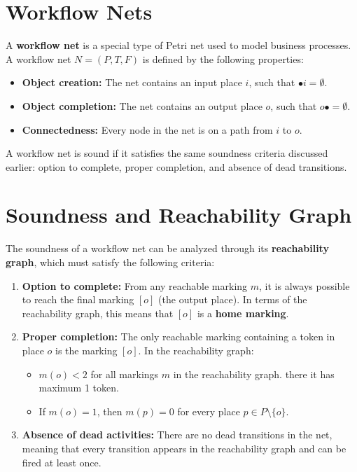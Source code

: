     \section{Workflow Nets}
    A \textbf{workflow net} is a special type of Petri net used to model business processes. A workflow net $N = (P, T, F)$ is defined by the following properties:
    \begin{itemize}
        \item \textbf{Object creation:} The net contains an input place $i$, such that $\bullet i = \emptyset$.
        \item \textbf{Object completion:} The net contains an output place $o$, such that $o\bullet = \emptyset$.
        \item \textbf{Connectedness:} Every node in the net is on a path from $i$ to $o$.
    \end{itemize}
    
    A workflow net is sound if it satisfies the same soundness criteria discussed earlier: option to complete, proper completion, and absence of dead transitions.
    
    \section{Soundness and Reachability Graph}
    The soundness of a workflow net can be analyzed through its \textbf{reachability graph}, which must satisfy the following criteria:
    
    \begin{enumerate}
        \item \textbf{Option to complete:} From any reachable marking $m$, it is always possible to reach the final marking $[o]$ (the output place). In terms of the reachability graph, this means that $[o]$ is a \textbf{home marking}.
        
        \item \textbf{Proper completion:} The only reachable marking containing a token in place $o$ is the marking $[o]$. In the reachability graph:
        \begin{itemize}
            \item $m(o) < 2$ for all markings $m$ in the reachability graph. there it has maximum 1 token.
            \item If $m(o) = 1$, then $m(p) = 0$ for every place $p \in P \setminus \{o\}$.
        \end{itemize}
        
        \item \textbf{Absence of dead activities:} There are no dead transitions in the net, meaning that every transition appears in the reachability graph and can be fired at least once.
    \end{enumerate}
    

